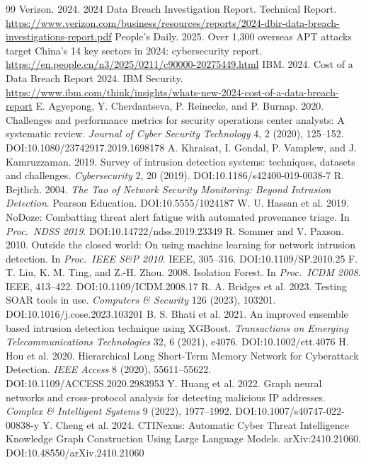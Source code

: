 \documentclass[sigconf,authordraft]{acmart}
\begin{document}
\begin{thebibliography}{99}
 Verizon. 2024. 2024 Data Breach Investigation Report. Technical Report. \url{https://www.verizon.com/business/resources/reports/2024-dbir-data-breach-investigations-report.pdf}
 People's Daily. 2025. Over 1,300 overseas APT attacks target China's 14 key sectors in 2024: cybersecurity report. \url{https://en.people.cn/n3/2025/0211/c90000-20275449.html}
 IBM. 2024. Cost of a Data Breach Report 2024. IBM Security. \url{https://www.ibm.com/think/insights/whats-new-2024-cost-of-a-data-breach-report}
 E. Agyepong, Y. Cherdantseva, P. Reinecke, and P. Burnap. 2020. Challenges and performance metrics for security operations center analysts: A systematic review. \textit{Journal of Cyber Security Technology} 4, 2 (2020), 125--152. DOI:10.1080/23742917.2019.1698178
 A. Khraisat, I. Gondal, P. Vamplew, and J. Kamruzzaman. 2019. Survey of intrusion detection systems: techniques, datasets and challenges. \textit{Cybersecurity} 2, 20 (2019). DOI:10.1186/s42400-019-0038-7
 R. Bejtlich. 2004. \textit{The Tao of Network Security Monitoring: Beyond Intrusion Detection}. Pearson Education. DOI:10.5555/1024187
 W. U. Hassan et al. 2019. NoDoze: Combatting threat alert fatigue with automated provenance triage. In \textit{Proc.\ NDSS 2019}. DOI:10.14722/ndss.2019.23349
 R. Sommer and V. Paxson. 2010. Outside the closed world: On using machine learning for network intrusion detection. In \textit{Proc.\ IEEE S\&P 2010}. IEEE, 305--316. DOI:10.1109/SP.2010.25
 F. T. Liu, K. M. Ting, and Z.-H. Zhou. 2008. Isolation Forest. In \textit{Proc.\ ICDM 2008}. IEEE, 413--422. DOI:10.1109/ICDM.2008.17
 R. A. Bridges et al. 2023. Testing SOAR tools in use. \textit{Computers \& Security} 126 (2023), 103201. DOI:10.1016/j.cose.2023.103201
 B. S. Bhati et al. 2021. An improved ensemble based intrusion detection technique using XGBoost. \textit{Transactions on Emerging Telecommunications Technologies} 32, 6 (2021), e4076. DOI:10.1002/ett.4076
 H. Hou et al. 2020. Hierarchical Long Short-Term Memory Network for Cyberattack Detection. \textit{IEEE Access} 8 (2020), 55611--55622. DOI:10.1109/ACCESS.2020.2983953
 Y. Huang et al. 2022. Graph neural networks and cross-protocol analysis for detecting malicious IP addresses. \textit{Complex \& Intelligent Systems} 9 (2022), 1977--1992. DOI:10.1007/s40747-022-00838-y
 Y. Cheng et al. 2024. CTINexus: Automatic Cyber Threat Intelligence Knowledge Graph Construction Using Large Language Models. arXiv:2410.21060. DOI:10.48550/arXiv.2410.21060

\end{thebibliography}
\end{document}
